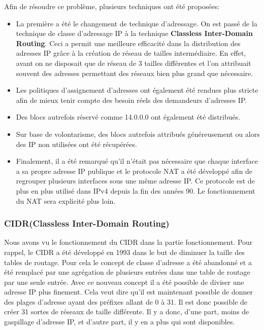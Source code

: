 Afin de résoudre ce problème, plusieurs techniques ont été proposées:
\begin{itemize}
\item La première a été le changement de technique d'adressage. On est passé de la
technique de classe d'adressage IP à la technique \textbf{Classless Inter-Domain
Routing}. Ceci a permit une meilleure efficacité dans la distribution des
adresses IP grâce à la création de réseau de tailles intermédiaire. En effet,
avant on ne disposait que de réseau de 3 tailles différentes et l'on attribuait
souvent des adresses permettant des réseaux bien plus grand que nécessaire.

\item Les politiques d'assignement d'adresses ont également été rendues plus stricte
afin de mieux tenir compte des besoin réels des demandeurs d'adresses IP.

\item Des blocs autrefois réservé comme 14.0.0.0 ont également été distribués.

\item Sur base de volontarisme, des blocs autrefois attribués généreusement ou alors
des IP non utilisées ont été récupérées.

\item Finalement, il a été remarqué qu'il n'était pas nécessaire que chaque interface
a sa propre adresse IP publique et le protocole NAT a été développé afin de regrouper
plusieurs interfaces sous une même adresse IP. Ce protocole est de plus en plus
utilisé dans IPv4 depuis la fin des années 90. Le fonctionnement du NAT sera explicité
plus loin.
\end{itemize}


\subsubsection{CIDR(Classless Inter-Domain Routing)}
Nous avons vu le fonctionnement du CIDR dans la partie fonctionnement. Pour rappel, le
CIDR a été développé en 1993 dans le but de diminuer la taille des tables de routage. Pour 
cela le concept de classe d'adresse a été abandonné et a été remplacé par une agrégation de 
plusieurs entrées dans une table de routage par une seule entrée.
Avec ce nouveau concept il a été possible de diviser une adresse IP plus finement. Cela veut 
dire qu'il est maintenant possible de donner des plages d'adresse ayant des préfixes allant 
de 0 à 31. Il est donc possible de créer 31 sortes de réseaux de taille différente. Il y a 
donc, d'une part, moins de gaspillage d'adresse IP, et d'autre part, il y en a plus qui sont disponibles.


